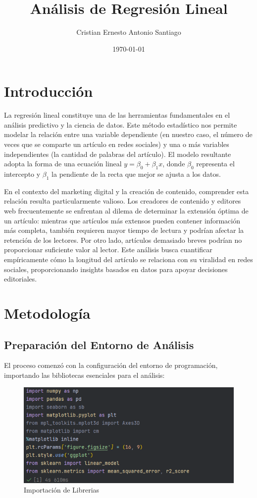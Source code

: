\documentclass[12pt, a4paper]{article}
\title{Análisis de Regresión Lineal}
\author{Cristian Ernesto Antonio Santiago}
\date{\today}
\begin{document}
\maketitle

\section{Introducción}
La regresión lineal constituye una de las herramientas fundamentales en el análisis predictivo y la ciencia de datos. Este método estadístico nos permite modelar la relación entre una variable dependiente (en nuestro caso, el número de veces que se comparte un artículo en redes sociales) y una o más variables independientes (la cantidad de palabras del artículo). El modelo resultante adopta la forma de una ecuación lineal $y = \beta_0 + \beta_1x$, donde $\beta_0$ representa el intercepto y $\beta_1$ la pendiente de la recta que mejor se ajusta a los datos.

En el contexto del marketing digital y la creación de contenido, comprender esta relación resulta particularmente valioso. Los creadores de contenido y editores web frecuentemente se enfrentan al dilema de determinar la extensión óptima de un artículo: mientras que artículos más extensos pueden contener información más completa, también requieren mayor tiempo de lectura y podrían afectar la retención de los lectores. Por otro lado, artículos demasiado breves podrían no proporcionar suficiente valor al lector. Este análisis busca cuantificar empíricamente cómo la longitud del artículo se relaciona con su viralidad en redes sociales, proporcionando insights basados en datos para apoyar decisiones editoriales.

\section{Metodología}

\subsection{Preparación del Entorno de Análisis}
El proceso comenzó con la configuración del entorno de programación, importando las bibliotecas esenciales para el análisis:

\begin{figure}[H]
    \centering
    \includegraphics[width=1.0\textwidth]{Actividad-9/Imagen1.png}
    \caption{Importación de Librerias}
\end{figure}
\end{document}

